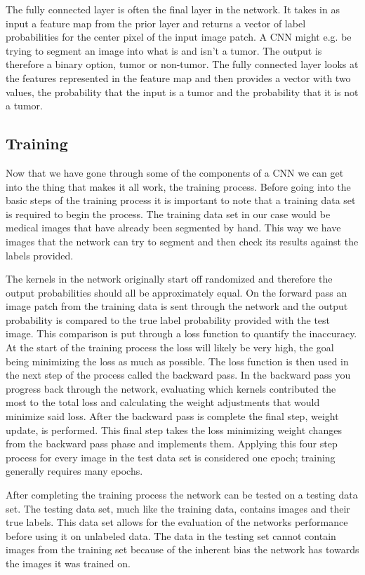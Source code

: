 \documentclass{sig-alternate}
\begin{document}
The fully connected layer is often the final layer in the network. It takes in as input a feature map from the prior layer and returns a vector of label probabilities for the center pixel of the input image patch. A CNN might e.g. be trying to segment an image into what is and isn't a tumor. The output is therefore a binary option, tumor or non-tumor. The fully connected layer looks at the features represented in the feature map and then provides a vector with two values, the probability that the input is a tumor and the probability that it is not a tumor.

\subsection{Training}
\label{sec:training}

Now that we have gone through some of the components of a CNN we can get into the thing that makes it all work, the training process. Before going into the basic steps of the training process it is important to note that a training data set is required to begin the process. The training data set in our case would be medical images that have already been segmented by hand. This way we have images that the network can try to segment and then check its results against the labels provided.

The kernels in the network originally start off randomized and therefore the output probabilities should all be approximately equal. On the forward pass an image patch from the training data is sent through the network and the output probability is compared to the true label probability provided with the test image. This comparison is put through a loss function to quantify the inaccuracy. At the start of the training process the loss will likely be very high, the goal being minimizing the loss as much as possible. The loss function is then used in the next step of the process called the backward pass. In the backward pass you progress back through the network, evaluating which kernels contributed the most to the total loss and calculating the weight adjustments that would minimize said loss. After the backward pass is complete the final step, weight update, is performed. This final step takes the loss minimizing weight changes from the backward pass phase and implements them. Applying this four step process for every image in the test data set is considered one epoch; training generally requires many epochs.

After completing the training process the network can be tested on a testing data set. The testing data set, much like the training data, contains images and their true labels. This data set allows for the evaluation of the networks performance before using it on unlabeled data. The data in the testing set cannot contain images from the training set because of the inherent bias the network has towards the images it was trained on.
\end{document}
